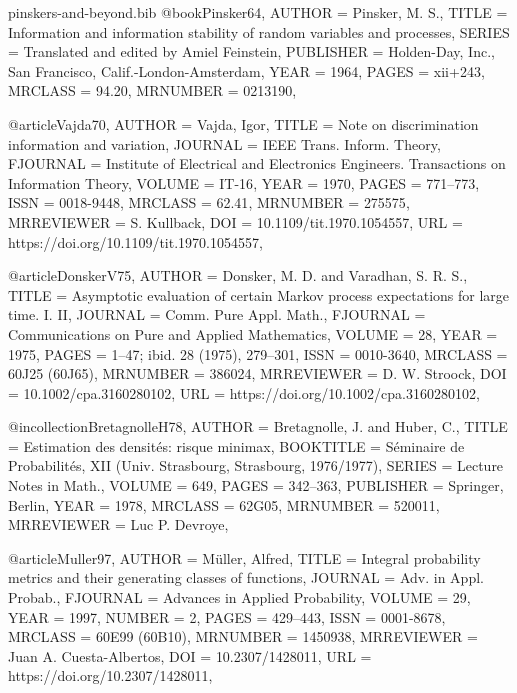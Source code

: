 \documentclass[10pt]{article}
\begin{document}
\begin{filecontents}{pinskers-and-beyond.bib}
@book{Pinsker64,
    AUTHOR = {Pinsker, M. S.},
     TITLE = {Information and information stability of random variables and
              processes},
    SERIES = {Translated and edited by Amiel Feinstein},
 PUBLISHER = {Holden-Day, Inc., San Francisco, Calif.-London-Amsterdam},
      YEAR = {1964},
     PAGES = {xii+243},
   MRCLASS = {94.20},
  MRNUMBER = {0213190},
}


@article{Vajda70,
    AUTHOR = {Vajda, Igor},
     TITLE = {Note on discrimination information and variation},
   JOURNAL = {IEEE Trans. Inform. Theory},
  FJOURNAL = {Institute of Electrical and Electronics Engineers.
              Transactions on Information Theory},
    VOLUME = {IT-16},
      YEAR = {1970},
     PAGES = {771--773},
      ISSN = {0018-9448},
   MRCLASS = {62.41},
  MRNUMBER = {275575},
MRREVIEWER = {S. Kullback},
       DOI = {10.1109/tit.1970.1054557},
       URL = {https://doi.org/10.1109/tit.1970.1054557},
}

@article{DonskerV75,
    AUTHOR = {Donsker, M. D. and Varadhan, S. R. S.},
     TITLE = {Asymptotic evaluation of certain {M}arkov process expectations
              for large time. {I}. {II}},
   JOURNAL = {Comm. Pure Appl. Math.},
  FJOURNAL = {Communications on Pure and Applied Mathematics},
    VOLUME = {28},
      YEAR = {1975},
     PAGES = {1--47; ibid. 28 (1975), 279--301},
      ISSN = {0010-3640},
   MRCLASS = {60J25 (60J65)},
  MRNUMBER = {386024},
MRREVIEWER = {D. W. Stroock},
       DOI = {10.1002/cpa.3160280102},
       URL = {https://doi.org/10.1002/cpa.3160280102},
}

@incollection{BretagnolleH78,
    AUTHOR = {Bretagnolle, J. and Huber, C.},
     TITLE = {Estimation des densit\'{e}s: risque minimax},
 BOOKTITLE = {S\'{e}minaire de {P}robabilit\'{e}s, {XII} ({U}niv. {S}trasbourg,
              {S}trasbourg, 1976/1977)},
    SERIES = {Lecture Notes in Math.},
    VOLUME = {649},
     PAGES = {342--363},
 PUBLISHER = {Springer, Berlin},
      YEAR = {1978},
   MRCLASS = {62G05},
  MRNUMBER = {520011},
MRREVIEWER = {Luc P. Devroye},
}

@article{Muller97,
    AUTHOR = {M\"{u}ller, Alfred},
     TITLE = {Integral probability metrics and their generating classes of
              functions},
   JOURNAL = {Adv. in Appl. Probab.},
  FJOURNAL = {Advances in Applied Probability},
    VOLUME = {29},
      YEAR = {1997},
    NUMBER = {2},
     PAGES = {429--443},
      ISSN = {0001-8678},
   MRCLASS = {60E99 (60B10)},
  MRNUMBER = {1450938},
MRREVIEWER = {Juan A. Cuesta-Albertos},
       DOI = {10.2307/1428011},
       URL = {https://doi.org/10.2307/1428011},
}


\end{filecontents}
\end{document}
